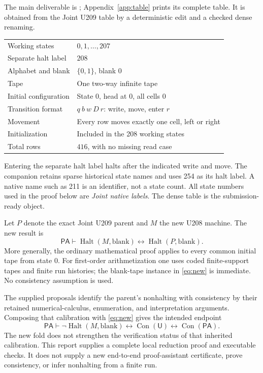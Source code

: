 \documentclass[11pt,letterpaper]{article}
\newcommand{\PA}{\mathsf{PA}}
\newcommand{\U}{\mathsf U}
\newcommand{\Con}{\operatorname{Con}}
\newcommand{\Halt}{\operatorname{Halt}}
\begin{document}
The main deliverable is ; Appendix~\ref{app:table}
prints its complete table. It is obtained from the Joint U209 table by a
deterministic edit and a checked dense renaming.

\begin{center}
\begin{tabular}{@{}ll@{}}
\toprule
Working states & $0,1,\ldots,207$\\
Separate halt label & $208$\\
Alphabet and blank & $\{0,1\}$, blank $0$\\
Tape & One two-way infinite tape\\
Initial configuration & State $0$, head at $0$, all cells $0$\\
Transition format & $q\ b\ w\ D\ r$: write, move, enter $r$\\
Movement & Every row moves exactly one cell, left or right\\
Initialization & Included in the 208 working states\\
Total rows & $416$, with no missing read case\\
\bottomrule
\end{tabular}
\end{center}

Entering the separate halt label halts after the indicated write and move.
The companion  retains sparse historical state
names and uses 254 as its halt label. A native name such as 211 is an
identifier, not a state count. All state numbers used in the proof below are
\emph{Joint native labels}. The dense table is the submission-ready object.

Let $P$ denote the exact Joint U209 parent and $M$ the new U208 machine.
The new result is
\begin{equation}\label{eq:new}
 \PA\vdash\Halt(M,\mathrm{blank})\leftrightarrow
                  \Halt(P,\mathrm{blank}).
\end{equation}
More generally, the ordinary mathematical proof applies to every common
initial tape from state 0. For first-order arithmetization one uses coded
finite-support tapes and finite run histories; the blank-tape instance in
\eqref{eq:new} is immediate. No consistency assumption is used.

The supplied proposals identify the parent's nonhalting with consistency by
their retained numerical-calculus, enumeration, and interpretation arguments.
Composing that calibration with \eqref{eq:new} gives the intended endpoint
\begin{equation}\label{eq:endpoint}
 \PA\vdash\neg\Halt(M,\mathrm{blank})
 \leftrightarrow\Con(\U)\leftrightarrow\Con(\PA).
\end{equation}
The new fold does not strengthen the verification status of that inherited
calibration. This report supplies a complete local reduction proof and
executable checks. It does not supply a new end-to-end proof-assistant
certificate, prove consistency, or infer nonhalting from a finite run.
\end{document}
